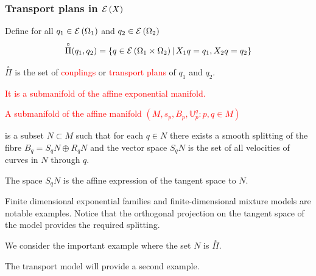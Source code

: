\documentclass[xcolor=svgnames]{beamer}
\newcommand{\eBspace}[1]{B_{#1}}
\newcommand{\rosso}[1]{\textcolor{red}{#1}}
\renewcommand{\emph}{\rosso}
\renewcommand{\transport}[2]{{\mathbb U} _ {#1} ^ {#2}}
\begin{document}
\begin{frame}\small\frametitle{Transport plans in $\operatorname{\mathcal E}\left(X\right)$}
 \begin{itemize}
 
     \item Define for all $q_1 \in \operatorname{\mathcal E}\left(\Omega_1\right)$ and $q_2 \in \operatorname{\mathcal E}\left(\Omega_2\right)$
     \begin{equation*}
         \overset{\circ}{\Pi}(q_1,q_2) = \left\{q \in \operatorname{\mathcal E}\left(\Omega_1 \times \Omega_2\right) \, \middle| \, X_1 q = q_1,X_2 q= q_2 \right\}
     \end{equation*}
 
 \item  $\overset{\circ}{\Pi}$ is the set of \emph{couplings} or \emph{transport plans} of $q_1$ and $q_2$. \emph{It is a submanifold of the affine exponential manifold.
 
     \item A \emph{submanifold} of the affine manifold $(M,s_p,\eBspace p,\transport p q \colon p,q \in M)$} is a subset $N \subset M$ such that for each $q \in N$ there exists a smooth splitting of the fibre $\eBspace q = S_q N \oplus R_q N$ and the vector space $S_q N$ is the set of all velocities of curves in $N$ through $q$. 

\item The space $S_qN$ is the affine expression of the tangent space to $N$.

 \item Finite dimensional exponential families and finite-dimensional mixture models are notable examples. Notice that the orthogonal projection on the tangent space of the model provides the required splitting.

\item We consider the important example where the set $N$ is $\overset{\circ}{\Pi}$.

   
    \item The transport model will provide a second example.    

\end{itemize}
\end{frame}
\end{document}
